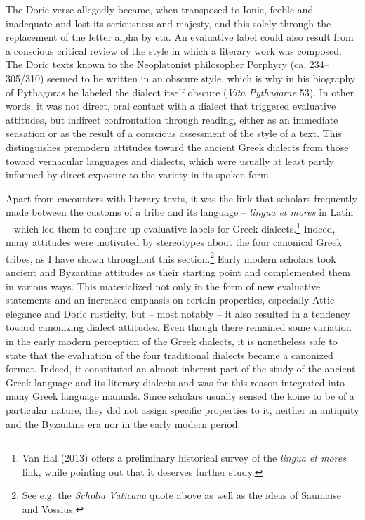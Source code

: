 \begin{styleStandard}
The Doric verse allegedly became, when transposed to Ionic, feeble and inadequate and lost its seriousness and majesty, and this solely through the replacement of the letter alpha by eta. An evaluative label could also result from a conscious critical review of the style in which a literary work was composed. The Doric texts known to the Neoplatonist philosopher Porphyry (ca. 234–305/310) seemed to be written in an obscure style, which is why in his biography of Pythagoras he labeled the dialect itself obscure (\textit{Vita Pythagorae} 53). In other words, it was not direct, oral contact with a dialect that triggered evaluative attitudes, but indirect confrontation through reading, either as an immediate sensation or as the result of a conscious assessment of the style of a text. This distinguishes premodern attitudes toward the ancient Greek dialects from those toward vernacular languages and dialects, which were usually at least partly informed by direct exposure to the variety in its spoken form.
\end{styleStandard}

\begin{styleStandard}
Apart from encounters with literary texts, it was the link that scholars frequently made between the customs of a tribe and its language – \textit{lingua et mores }in Latin – which led them to conjure up evaluative labels for Greek dialects.\footnote{ Van Hal (2013) offers a preliminary historical survey of the \textit{lingua et mores} link, while pointing out that it deserves further study.} Indeed, many attitudes were motivated by stereotypes about the four canonical Greek tribes, as I have shown throughout this section.\footnote{ See e.g. the \textit{Scholia Vaticana} quote above as well as the ideas of Saumaise and Vossius.} Early modern scholars took ancient and Byzantine attitudes as their starting point and complemented them in various ways. This materialized not only in the form of new evaluative statements and an increased emphasis on certain properties, especially Attic elegance and Doric rusticity, but – most notably – it also resulted in a tendency toward canonizing dialect attitudes. Even though there remained some variation in the early modern perception of the Greek dialects, it is nonetheless safe to state that the evaluation of the four traditional dialects became a canonized format. Indeed, it constituted an almost inherent part of the study of the ancient Greek language and its literary dialects and was for this reason integrated into many Greek language manuals. Since scholars usually sensed the koine to be of a particular nature, they did not assign specific properties to it, neither in antiquity and the Byzantine era nor in the early modern period.
\end{styleStandard}

